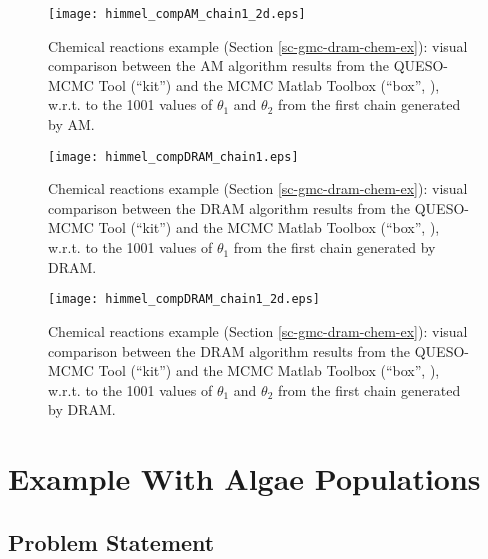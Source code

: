 \begin{figure}[h!]
\begin{center}
\texttt{[image: himmel\_compAM\_chain1\_2d.eps]}
\end{center}
\caption{Chemical reactions example (Section \ref{sc-gmc-dram-chem-ex}):
visual comparison between the AM algorithm results from the QUESO-MCMC Tool (``kit'') and the MCMC Matlab Toolbox (``box'', \cite{mcmctool}), w.r.t. to the 1001 values of $\theta_1$ and $\theta_2$ from the first chain generated by AM.
}
\label{fig-dram-chem-ex-comparison-AM-theta1-chain1-2d}
\end{figure}

\begin{figure}[h!]
\begin{center}
\texttt{[image: himmel\_compDRAM\_chain1.eps]}
\end{center}
\caption{Chemical reactions example (Section \ref{sc-gmc-dram-chem-ex}):
visual comparison between the DRAM algorithm results from the QUESO-MCMC Tool (``kit'') and the MCMC Matlab Toolbox (``box'', \cite{mcmctool}), w.r.t. to the 1001 values of $\theta_1$ from the first chain generated by DRAM.
}
\label{fig-dram-chem-ex-comparison-DRAM-theta1-chain1}
\end{figure}

\begin{figure}[h!]
\begin{center}
\texttt{[image: himmel\_compDRAM\_chain1\_2d.eps]}
\end{center}
\caption{Chemical reactions example (Section \ref{sc-gmc-dram-chem-ex}):
visual comparison between the DRAM algorithm results from the QUESO-MCMC Tool (``kit'') and the MCMC Matlab Toolbox (``box'', \cite{mcmctool}), w.r.t. to the 1001 values of $\theta_1$ and $\theta_2$ from the first chain generated by DRAM.
}
\label{fig-dram-chem-ex-comparison-DRAM-theta1-chain1-2d}
\end{figure}

\clearpage

\section{Example With Algae Populations}\label{sc-gmc-dram-algae-ex}

\subsection{Problem Statement}
$~$\\

